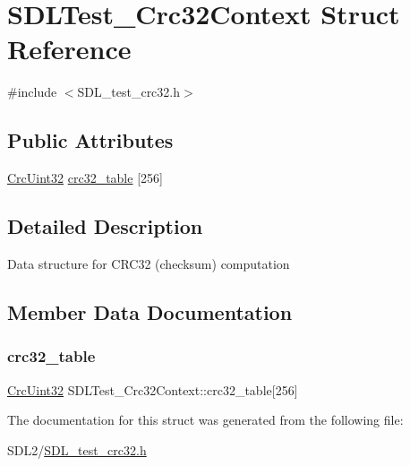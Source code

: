 \hypertarget{struct_s_d_l_test___crc32_context}{}\section{S\+D\+L\+Test\+\_\+\+Crc32\+Context Struct Reference}
\label{struct_s_d_l_test___crc32_context}


{\ttfamily \#include $<$S\+D\+L\+\_\+test\+\_\+crc32.\+h$>$}

\subsection*{Public Attributes}
\begin{DoxyCompactItemize}
\item 
\hyperlink{_s_d_l__test__crc32_8h_ac0e8fe38fa91e9aa4b32957420795387}{Crc\+Uint32} \hyperlink{struct_s_d_l_test___crc32_context_ae95d0d0b48bafc4e2f6f032f754ffa4c}{crc32\+\_\+table} \mbox{[}256\mbox{]}
\end{DoxyCompactItemize}


\subsection{Detailed Description}
Data structure for C\+R\+C32 (checksum) computation 

\subsection{Member Data Documentation}
\mbox{\label{struct_s_d_l_test___crc32_context_ae95d0d0b48bafc4e2f6f032f754ffa4c}} 
\subsubsection{\texorpdfstring{crc32\+\_\+table}{crc32\_table}}
{\footnotesize\ttfamily \hyperlink{_s_d_l__test__crc32_8h_ac0e8fe38fa91e9aa4b32957420795387}{Crc\+Uint32} S\+D\+L\+Test\+\_\+\+Crc32\+Context\+::crc32\+\_\+table\mbox{[}256\mbox{]}}



The documentation for this struct was generated from the following file\+:\begin{DoxyCompactItemize}
\item 
S\+D\+L2/\hyperlink{_s_d_l__test__crc32_8h}{S\+D\+L\+\_\+test\+\_\+crc32.\+h}\end{DoxyCompactItemize}
